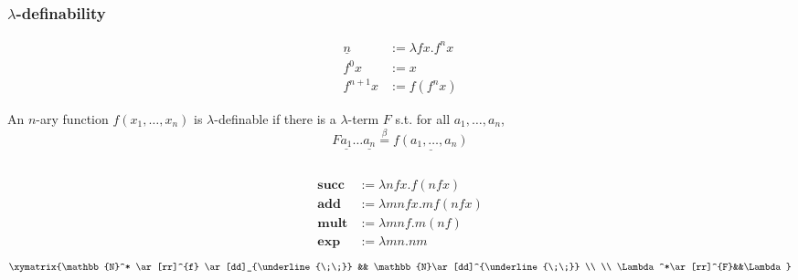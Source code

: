 \documentclass[UTF8,aspectratio=43,11pt,colorlinks,compress,openany]{beamer}%
\begin{document}
\begin{frame}\frametitle{$\lambda$-definability}
	\setlength\abovedisplayskip{0pt}
	\setlength\belowdisplayskip{0pt}
	\begin{align*}
	\underline{n}&:=\lambda fx.f^nx\\
	f^0x&:=x\\
	f^{n+1}x&:=f(f^nx)
	\end{align*}
	\begin{definition}
		An $n$-ary function $f(x_1,\dots,x_n)$ is $\lambda$-definable if there is a $\lambda$-term $F$ s.t. for all $a_1,\dots,a_n$,
		\[F\underline{a_1}\dots\underline{a_n}\stackrel{\beta}{=}\underline{f(a_1,\dots,a_n)}\]
	\end{definition}
\begin{columns}
	\centering{}
	\begin{align*}
		\mathbf{succ}&:=\lambda nfx.f(nfx)\\
		\mathbf{add}&:=\lambda mnfx.mf(nfx)\\
		\mathbf{mult}&:=\lambda mnf.m(nf)\\
		\mathbf{exp}&:=\lambda mn.nm
	\end{align*}
\[\xymatrix{\mathbb{N}^*
		\ar[rr]^{f} \ar[dd]_{\underline{\;\;}} && \mathbb{N}\ar[dd]^{\underline{\;\;}}
		\\
		\\
		\Lambda^*\ar[rr]^{F}&&\Lambda}\]
\end{columns}
\end{frame}
\end{document}
